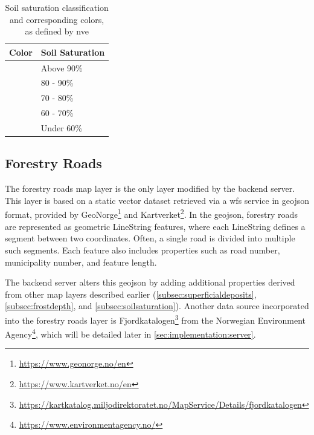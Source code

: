 \begin{table}[h]
    \centering
    \begin{tabular}{|l|l|}
        \hline  
        \textbf{Color} & \textbf{Soil Saturation} \\
        \hline
        \cellcolor[HTML]{f82200} & Above 90\% \\
        \hline
        \cellcolor[HTML]{f8c400} & 80 - 90\% \\
        \hline
        \cellcolor[HTML]{f8fc00} & 70 - 80\% \\
        \hline
        \cellcolor[HTML]{29d460} & 60 - 70\% \\
        \hline
        \cellcolor[HTML]{e4e4e4} & Under 60\% \\
        \hline
    \end{tabular}
    \caption[Soil saturation classification and corresponding colors]{Soil saturation classification and corresponding colors, as defined by \acrshort{nve} \cite{nve2025waterdata}}
    \label{tab:soil_saturation_classification}
\end{table}

\subsection{Forestry Roads}\label{subsec:mapdatasources:maplayers:forestryroads}

The forestry roads map layer is the only layer modified by the backend server. This layer is based on a static vector dataset retrieved via a \gls{wfs} service in \gls{geojson} format, provided by GeoNorge\footnote{\url{https://www.geonorge.no/en}} and Kartverket\footnote{\url{https://www.kartverket.no/en}}. In the \gls{geojson}, forestry roads are represented as geometric LineString features, where each LineString defines a segment between two coordinates. Often, a single road is divided into multiple such segments. Each feature also includes properties such as road number, municipality number, and feature length.

The backend server alters this \gls{geojson} by adding additional properties derived from other map layers described earlier (\ref{subsec:superficialdeposits}, \ref{subsec:frostdepth}, and \ref{subsec:soilsaturation}). Another data source incorporated into the forestry roads layer is Fjordkatalogen\footnote{\url{https://kartkatalog.miljodirektoratet.no/MapService/Details/fjordkatalogen}} from the Norwegian Environment Agency\footnote{\url{https://www.environmentagency.no/}}, which will be detailed later in \autoref{sec:implementation:server}. 

